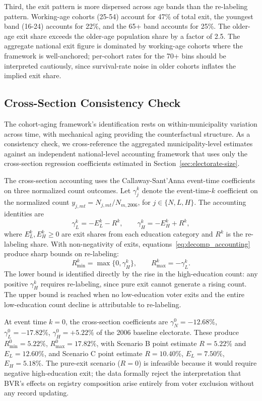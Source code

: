 Third, the exit pattern is more dispersed across age bands than the re-labeling pattern. Working-age cohorts (25-54) account for 47\% of total exit, the youngest band (16-24) accounts for 22\%, and the 65+ band accounts for 25\%. The older-age exit share exceeds the older-age population share by a factor of 2.5. The aggregate national exit figure is dominated by working-age cohorts where the framework is well-anchored; per-cohort rates for the 70+ bins should be interpreted cautiously, since survival-rate noise in older cohorts inflates the implied exit share.

\subsection{Cross-Section Consistency Check}
\label{ssec:decomposition_crosscheck}

The cohort-aging framework's identification rests on within-municipality variation across time, with mechanical aging providing the counterfactual structure. As a consistency check, we cross-reference the aggregated municipality-level estimates against an independent national-level accounting framework that uses only the cross-section regression coefficients estimated in Section~\ref{sec:electorate-size}.

The cross-section accounting uses the Callaway-Sant'Anna event-time coefficients on three normalized count outcomes. Let $\gamma_j^k$ denote the event-time-$k$ coefficient on the normalized count $y_{j,mt} = N_{j,mt}/N_{m,2006}$, for $j \in \{N, L, H\}$. The accounting identities are
\begin{equation}
\gamma_L^k = -E_L^k - R^k, \qquad \gamma_H^k = -E_H^k + R^k,
\label{eq:decomp_accounting}
\end{equation}
where $E_L^k, E_H^k \geq 0$ are exit shares from each education category and $R^k$ is the re-labeling share. With non-negativity of exits, equations~\eqref{eq:decomp_accounting} produce sharp bounds on re-labeling:
\[
R_{\min}^k = \max\{0, \gamma_H^k\}, \qquad R_{\max}^k = -\gamma_L^k.
\]
The lower bound is identified directly by the rise in the high-education count: any positive $\gamma_H^k$ requires re-labeling, since pure exit cannot generate a rising count. The upper bound is reached when no low-education voter exits and the entire low-education count decline is attributable to re-labeling.

At event time $k = 0$, the cross-section coefficients are $\gamma_N^0 = -12.68\%$, $\gamma_L^0 = -17.82\%$, $\gamma_H^0 = +5.22\%$ of the 2006 baseline electorate. These produce $R_{\min}^0 = 5.22\%$, $R_{\max}^0 = 17.82\%$, with Scenario B point estimate $R = 5.22\%$ and $E_L = 12.60\%$, and Scenario C point estimate $R = 10.40\%$, $E_L = 7.50\%$, $E_H = 5.18\%$. The pure-exit scenario ($R = 0$) is infeasible because it would require negative high-education exit; the data formally reject the interpretation that BVR's effects on registry composition arise entirely from voter exclusion without any record updating.

